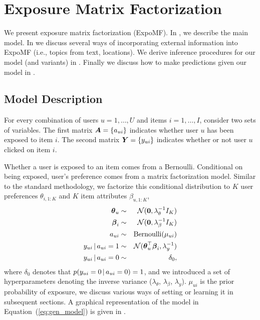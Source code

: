 


\section{Exposure Matrix Factorization}\label{sec:model}

We present exposure matrix factorization (ExpoMF). 
In , we describe the main model. 
In  we discuss several ways 
of incorporating external information into ExpoMF (i.e., topics from text, locations). 
We derive inference procedures for our model (and variants) in . Finally we discuss how to make predictions given our model in .

\subsection{Model Description}
\label{sec:model_description}

For every combination of users $u=1,\dots,U$ and items $i=1,\dots,I$, consider two sets of variables. The first matrix $\boldsymbol{A} = \left\{ a_{ui} \right\}$ indicates whether user $u$ has been exposed to item $i$. The second matrix $\boldsymbol{Y} = \left\{ y_{ui} \right\}$ indicates whether or not user $u$ clicked on item $i$.

Whether a user is exposed to an item comes from a Bernoulli. Conditional on being exposed, user's preference comes from a matrix factorization model. Similar to the standard methodology, we factorize this conditional distribution to $K$ user preferences $\theta_{i,1:K}$ and $K$ item attributes $\beta_{u,1:K}$,
\begin{eqnarray} %
	\boldsymbol\theta_{u} &\sim& \mathcal{N}(\bzero, \lambda_\theta^{-1} I_K) \nonumber \\
	\boldsymbol\beta_{i} &\sim& \mathcal{N}(\bzero, \lambda_\beta^{-1} I_K)  \nonumber \\
	a_{ui} &\sim& \mathrm{Bernoulli}(\mu_{ui}) \nonumber \\
	y_{ui} \g a_{ui} = 1 &\sim& \mathcal{N}(\boldsymbol\theta_u^\top \boldsymbol\beta_i, \lambda_y^{-1}) \nonumber \\
	y_{ui} \g a_{ui} = 0 &\sim& \delta_0,
	\label{eq:gen_model}
 \end{eqnarray}
where $\delta_0$ denotes that $p(y_{ui} = 0 \,\vert\, a_{ui} = 0) = 1$, and we
introduced a set of hyperparameters denoting the inverse variance
($\lambda_\theta$, $\lambda_\beta$, $\lambda_y$). $\mu_{ui}$ is the prior
probability of exposure, we discuss various ways of setting or learning it
in subsequent sections. 
A graphical representation of the model in Equation~(\ref{eq:gen_model}) is given in . 

